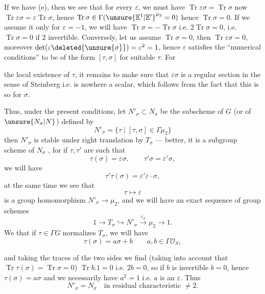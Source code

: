 If we have (e), then we see that for every  $\varepsilon$,
we must have $\operatorname{Tr}\varepsilon\sigma=\operatorname{Tr}\sigma$
now $\operatorname{Tr}\varepsilon\sigma=\varepsilon\operatorname{Tr}\sigma$, hence
$\operatorname{Tr}\sigma\in\Gamma(\unsure{\mathbb E^1|\mathbb E'}^{\mu_2}=0)$
hence $\operatorname{Tr}\sigma=0$. If we assume it only for $\varepsilon=-1$,
we will have $\operatorname{Tr}\sigma=-\operatorname{Tr}\sigma$ i.e.
$2\operatorname{Tr}\sigma=0$, i.e. $\operatorname{Tr}\sigma=0$ if $2$ invertible.
Conversely, let us assume $\operatorname{Tr}\sigma=0$, then
$\operatorname{Tr}\varepsilon\sigma=0$, moreover
$\det(\varepsilon\deleted{\unsure{\sigma}})=\varepsilon^2=1$, hence $\varepsilon$ satisfies
the ``numerical conditions'' to be of the form $[\tau,\sigma]$ for
suitable $\tau$. For

 the local existence of $\tau$, it remains to make sure that
$\varepsilon\sigma$ is a regular section in the sense of Steinberg i.e. is nowhere
a scalar, which follows from the fact that this is so for $\sigma$.

Thus, under the present conditions, let $N'_\sigma\subset N_\sigma$ be the subscheme of
 $G$ (or of $\unsure{N_\sigma|N}$) defined by
\[
\tag{22}
N'_\sigma=\{\tau\mid[\tau,\sigma]\in\Gamma\mu_2\}
\]
then $N'_\sigma$ is stable under right translation by $T_\sigma$ --- better,
it is a subgroup scheme of $N_\sigma$ , for if
$\tau,\tau'$ are such that
\[
\tau(\sigma)=\varepsilon\sigma,\qquad\tau'\sigma=\varepsilon'\sigma,
\]
we will have
\[
\tau'\tau(\sigma)=\varepsilon'\varepsilon\cdot\sigma,
\]
at the same time we see that
\[
\tau\longmapsto\varepsilon
\]
is a group homomorphism $N'_\sigma\longrightarrow\mu_2$, and we will have an exact sequence of
group schemes
\[
\tag{23}
1\longrightarrow T_\sigma\hookrightarrow N'_\sigma
\xrightarrow{\varepsilon_\sigma}\mu_2\longrightarrow1.
\]
We  that if $\tau\in\Gamma G$ normalizes $T_\sigma$, we will have
\[
\tau(\sigma)=a\sigma+b\qquad a,b\in\Gamma\mathcal O_S,
\]

and taking the traces of the two sides we find (taking into account that
$\operatorname{Tr}\tau(\sigma)=\operatorname{Tr}\sigma=0$)
$\operatorname{Tr}b.1=0$ i.e. $2b=0$, so if $b$ is invertible
$b=0$, hence $\tau(\sigma)=a\sigma$ and we necessarily have $a^2=1$ i.e. $a$ is an
$\varepsilon$. Thus
\[
\tag{24}
N'_\sigma=N_\sigma\quad\text{in residual characteristic }\ne2.
\]

